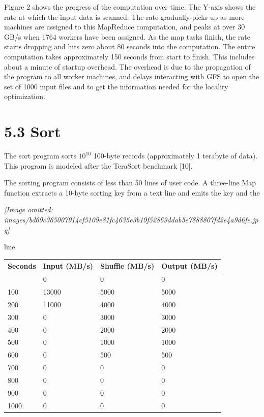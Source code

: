 \documentclass[
]{article}
\newcounter{none} %
\begin{document}
Figure 2 shows the progress of the computation over time. The Y-axis
shows the rate at which the input data is scanned. The rate gradually
picks up as more machines are assigned to this MapReduce computation,
and peaks at over 30 GB/s when 1764 workers have been assigned. As the
map tasks finish, the rate starts dropping and hits zero about 80
seconds into the computation. The entire computation takes approximately
150 seconds from start to finish. This includes about a minute of
startup overhead. The overhead is due to the propagation of the program
to all worker machines, and delays interacting with GFS to open the set
of 1000 input files and to get the information needed for the locality
optimization.

\section{5.3 Sort}\label{sort}

The sort program sorts \(10^{10}\) 100-byte records (approximately 1
terabyte of data). This program is modeled after the TeraSort benchmark
{[}10{]}.

The sorting program consists of less than 50 lines of user code. A
three-line Map function extracts a 10-byte sorting key from a text line
and emits the key and the

\textit{[Image omitted: images/bd69c365007914cf5109e81fc4635e3b19f52869ddab5e7888807fd2e4a9d6fe.jpg]}

line

{\def\LTcaptype{none} %
\begin{longtable}[]{@{}llll@{}}
\toprule\noalign{}
Seconds & Input (MB/s) & Shuffle (MB/s) & Output (MB/s) \\
\midrule\noalign{}
\endhead
\bottomrule\noalign{}
\endlastfoot
0 & 0 & 0 & 0 \\
100 & 13000 & 5000 & 5000 \\
200 & 11000 & 4000 & 4000 \\
300 & 0 & 3000 & 3000 \\
400 & 0 & 2000 & 2000 \\
500 & 0 & 1000 & 1000 \\
600 & 0 & 500 & 500 \\
700 & 0 & 0 & 0 \\
800 & 0 & 0 & 0 \\
900 & 0 & 0 & 0 \\
1000 & 0 & 0 & 0 \\
\end{longtable}
}
\end{document}
